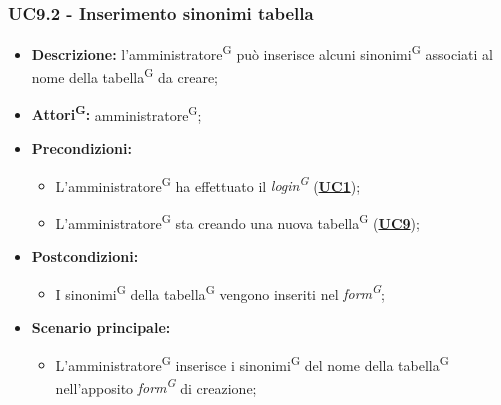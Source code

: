 \subsubsection{UC9.2 - Inserimento sinonimi tabella}
\label{sec:UC9.2}
\begin{itemize}
	\item \textbf{Descrizione:} l’amministratore\textsuperscript{G} può inserisce alcuni sinonimi\textsuperscript{G} associati al nome della tabella\textsuperscript{G} da creare;
	\item \textbf{Attori\textsuperscript{G}:} amministratore\textsuperscript{G};
	\item \textbf{Precondizioni:} 
	\begin{itemize}
		\item L’amministratore\textsuperscript{G} ha effettuato il \textit{login\textsuperscript{G}} (\hyperref[sec:UC1]{\textbf{UC1}});
		\item L’amministratore\textsuperscript{G} sta creando una nuova tabella\textsuperscript{G} (\hyperref[sec:UC9]{\textbf{UC9}});
	\end{itemize}
	\item \textbf{Postcondizioni:} 
	\begin{itemize}
		\item I sinonimi\textsuperscript{G} della tabella\textsuperscript{G} vengono inseriti nel \textit{form\textsuperscript{G}};
	\end{itemize}
	\item \textbf{Scenario principale:} 
	\begin{itemize}
		\item L’amministratore\textsuperscript{G} inserisce i sinonimi\textsuperscript{G} del nome della tabella\textsuperscript{G} nell'apposito \textit{form\textsuperscript{G}} di creazione;
	\end{itemize}
\end{itemize}


